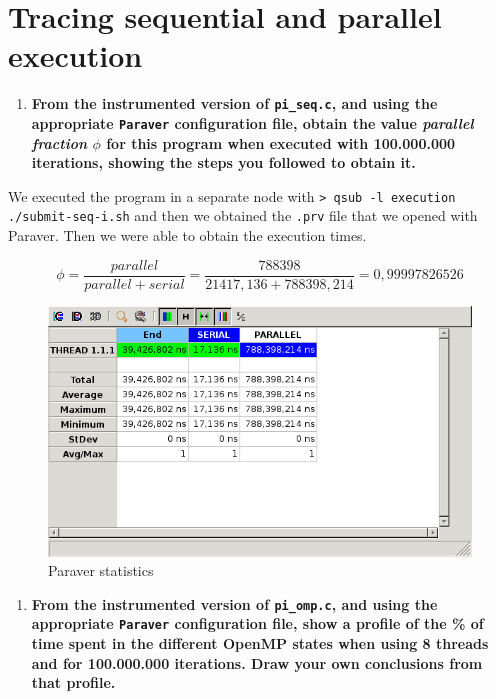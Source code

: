 \documentclass[a4paper]{article}
\begin{document}
\section*{Tracing sequential and parallel execution}

\begin{enumerate}[resume]
	\item \textbf{From the instrumented version of \texttt{pi\_seq.c}, and using the appropriate \texttt{Paraver} configuration file, obtain the value \textit{parallel fraction} $\phi$ for this program when executed with 100.000.000 iterations, showing the steps you followed to obtain it.}
\end{enumerate}

We executed the program in a separate node with \verb|> qsub -l execution ./submit-seq-i.sh| and then we obtained the \verb|.prv| file that we opened with Paraver. Then we were able to obtain the execution times.

$$
\phi = \frac{parallel}{parallel + serial} = \frac{788398}{21417,136 + 788398,214} = 0,99997826526
$$

\begin{figure}[H]
    \centering
    \includegraphics[width=\textwidth]{image01}
    \caption{Paraver statistics}
\end{figure}

\begin{enumerate}[resume]
	\item \textbf{From the instrumented version of \texttt{pi\_omp.c}, and using the appropriate \texttt{Paraver} configuration file, show a profile of the \% of time spent in the different OpenMP states when using 8 threads and for 100.000.000 iterations. Draw your own conclusions from that profile.}
\end{enumerate}
\end{document}
